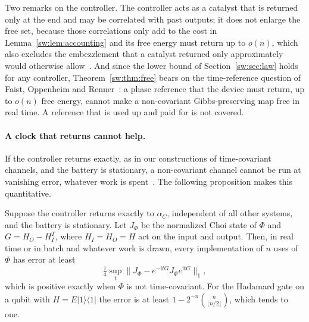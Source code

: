 Two remarks on the controller. The controller acts as a catalyst that is returned only at the end and may be correlated with past outputs; it does not enlarge the free set, because those correlations only add to the cost in Lemma~\ref{sw:lem:accounting} and its free energy must return up to $o(n)$, which also excludes the embezzlement that a catalyst returned only approximately would otherwise allow~\cite{FOR15}. And since the lower bound of Section~\ref{sw:sec:law} holds for any controller, Theorem~\ref{sw:thm:free} bears on the time-reference question of Faist, Oppenheim and Renner~\cite{FOR15}: a phase reference that the device must return, up to $o(n)$ free energy, cannot make a non-covariant Gibbs-preserving map free in real time. A reference that is used up and paid for is not covered.

\paragraph{A clock that returns cannot help.} If the controller returns exactly, as in our constructions of time-covariant channels, and the battery is stationary, a non-covariant channel cannot be run at vanishing error, whatever work is spent~\cite{MarvianSpekkens19,LostaglioMuller19}. The following proposition makes this quantitative.

\begin{proposition}\label{sw:prop:clock}
Suppose the controller returns exactly to $\alpha_C$, independent of all other systems, and the battery is stationary. Let $J_\Phi$ be the normalized Choi state of $\Phi$ and $G=H_O-H_I^T$, where $H_I=H_O=H$ act on the input and output. Then, in real time or in batch and whatever work is drawn, every implementation of $n$ uses of $\Phi$ has error at least
\[
\tfrac14\sup_t\bigl\|J_\Phi-e^{-\mathrm itG}J_\Phi e^{\mathrm itG}\bigr\|_1,
\]
which is positive exactly when $\Phi$ is not time-covariant. For the Hadamard gate on a qubit with $H=E|1\rangle\langle1|$ the error is at least $1-2^{-n}\binom{n}{\lfloor n/2\rfloor}$, which tends to one.
\end{proposition}

